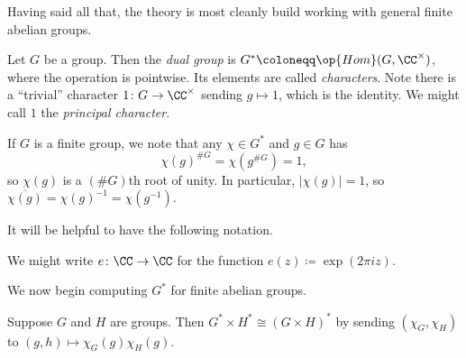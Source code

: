 \documentclass[../notes.tex]{subfiles}
\begin{document}
Having said all that, the theory is most cleanly build working with general finite abelian groups.
\begin{definition} 
	Let $G$ be a group. Then the \textit{dual group} is $G^*\coloneqq\op{Hom}(G,\CC^\times)$, where the operation is pointwise. Its elements are called \textit{characters}. Note there is a ``trivial'' character $1\colon G\to\CC^\times$ sending $g\mapsto1$, which is the identity. We might call $1$ the \textit{principal character}.
\end{definition}
\begin{remark} \label{rem:chars-to-s1}
	If $G$ is a finite group, we note that any $\chi\in G^*$ and $g\in G$ has
	\[\chi(g)^{\#G}=\chi\left(g^{\#G}\right)=1,\]
	so $\chi(g)$ is a $(\#G)$th root of unity. In particular, $|\chi(g)|=1$, so $\overline{\chi(g)}=\chi(g)^{-1}=\chi\left(g^{-1}\right)$.
\end{remark}
It will be helpful to have the following notation.
\begin{notation}
	We might write $e\colon\CC\to\CC$ for the function $e(z)\coloneqq\exp(2\pi iz)$.
\end{notation}
We now begin computing $G^*$ for finite abelian groups.
\begin{lemma} \label{lem:prod-dual}
	Suppose $G$ and $H$ are groups. Then $G^*\times H^*\cong(G\times H)^*$ by sending $(\chi_G,\chi_H)$ to $(g,h)\mapsto\chi_G(g)\chi_H(g)$.
\end{lemma}
\end{document}
